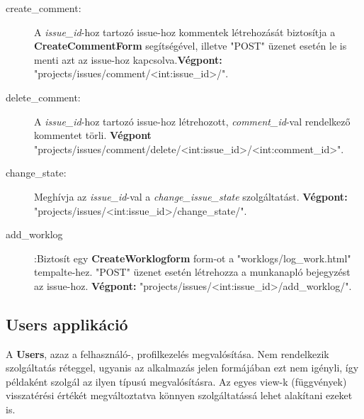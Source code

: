 \begin{itemize}
\begin{description}
		\item[create\_comment:] A \textit{issue\_id}-hoz tartozó issue-hoz kommentek létrehozását biztosítja a \textbf{CreateCommentForm} segítségével, illetve "POST" üzenet esetén le is menti azt az issue-hoz kapcsolva.\textbf{Végpont:} "projects/issues/comment/<int:issue\_id>/".
		\item[delete\_comment:] A \textit{issue\_id}-hoz tartozó issue-hoz létrehozott, \textit{comment\_id}-val rendelkező kommentet törli. \textbf{Végpont} "projects/issues/comment/delete/<int:issue\_id>/<int:comment\_id>".
		\item[change\_state:] Meghívja az \textit{issue\_id}-val a \textit{change\_issue\_state} szolgáltatást. \textbf{Végpont:} "projects/issues/<int:issue\_id>/change\_state/".
		\item[add\_worklog]:Biztosít egy \textbf{CreateWorklogform} form-ot a "worklogs/log\_work.html" tempalte-hez. "POST" üzenet esetén létrehozza a munkanapló bejegyzést az issue-hoz. \textbf{Végpont:} "projects/issues/<int:issue\_id>/add\_worklog/".
	\end{description}
\end{itemize}	

\subsection{Users applikáció}

A \textbf{Users}, azaz a felhasználó-, profilkezelés megvalósítása. Nem rendelkezik szolgáltatás réteggel, ugyanis az alkalmazás jelen formájában ezt nem igényli, így példaként szolgál az ilyen típusú megvalósításra. Az egyes view-k (függvények) visszatérési értékét megváltoztatva könnyen szolgáltatássá lehet alakítani ezeket is.

